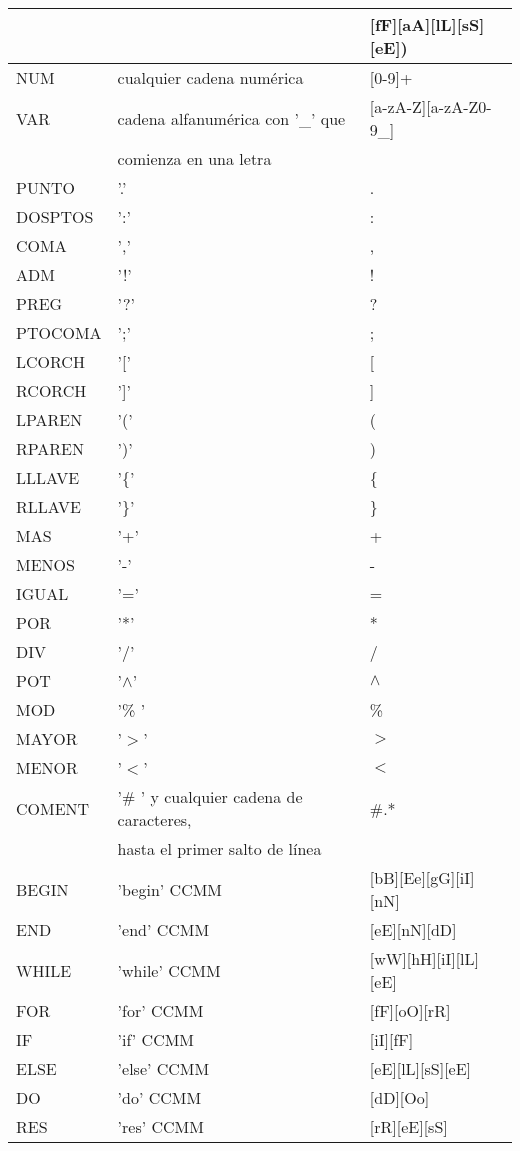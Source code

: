 \begin{table}[!htb]
\begin{center}
\begin{tabular}{| l | l | l |}
	& 				& [fF][aA][lL][sS][eE]) \\
\hline
NUM 	& cualquier cadena numérica & [0-9]+ \\
\hline
VAR 	& cadena alfanumérica con '_' que  & [a-zA-Z][a-zA-Z0-9_] \\
	& comienza en una letra				&	\\
\hline
PUNTO & '.' & . \\
\hline
DOSPTOS	& ':' & : \\
\hline
COMA & ',' & , \\
\hline
ADM & '!' & ! \\
\hline
PREG & '?' & ? \\
\hline
PTOCOMA 	& ';' & ; \\
\hline
LCORCH & '[' & [ \\
\hline
RCORCH & ']' & ] \\
\hline
LPAREN & '(' & ( \\
\hline
RPAREN & ')' & ) \\
\hline
LLLAVE & '\{' & \{ \\
\hline
RLLAVE& '\}' & \} \\
\hline
MAS & '+' & + \\
\hline
MENOS & '-' & - \\
\hline
IGUAL & '=' & = \\
\hline
POR & '*' & * \\
\hline
DIV & '/' & / \\
\hline
POT & '$\wedge$' & $\wedge$  \\
\hline
MOD & '\% ' & \% \\
\hline
MAYOR & '$>$' & $>$ \\
\hline
MENOR & '$<$' & $<$ \\
\hline
COMENT &'\# ' y cualquier cadena de caracteres, & \#.* \\
		&  hasta el primer salto de línea		&	\\
\hline
BEGIN & 'begin' CCMM &  [bB][Ee][gG][iI][nN]\\
\hline
END & 'end' CCMM & [eE][nN][dD] \\
\hline
WHILE & 'while' CCMM & [wW][hH][iI][lL][eE] \\
\hline
FOR & 'for' CCMM & [fF][oO][rR] \\
\hline
IF & 'if' CCMM & [iI][fF] \\
\hline
ELSE & 'else' CCMM & [eE][lL][sS][eE] \\
\hline
DO & 'do' CCMM & [dD][Oo] \\
\hline
RES & 'res' CCMM & [rR][eE][sS] \\

\end{tabular}
\end{center}
\end{table}
